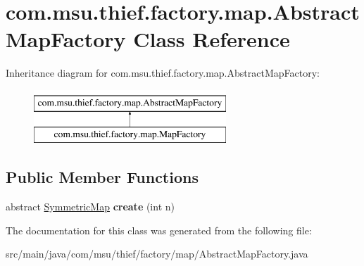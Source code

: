 \hypertarget{classcom_1_1msu_1_1thief_1_1factory_1_1map_1_1AbstractMapFactory}{\section{com.\-msu.\-thief.\-factory.\-map.\-Abstract\-Map\-Factory Class Reference}
\label{classcom_1_1msu_1_1thief_1_1factory_1_1map_1_1AbstractMapFactory}
}
Inheritance diagram for com.\-msu.\-thief.\-factory.\-map.\-Abstract\-Map\-Factory\-:\begin{figure}[H]
\begin{center}
\leavevmode
\includegraphics[height=2.000000cm]{classcom_1_1msu_1_1thief_1_1factory_1_1map_1_1AbstractMapFactory}
\end{center}
\end{figure}
\subsection*{Public Member Functions}
\begin{DoxyCompactItemize}
\item 
\hypertarget{classcom_1_1msu_1_1thief_1_1factory_1_1map_1_1AbstractMapFactory_a8d7acb0ef65995620cb558c1e3de2b3e}{abstract \hyperlink{classcom_1_1msu_1_1thief_1_1model_1_1SymmetricMap}{Symmetric\-Map} {\bfseries create} (int n)}\label{classcom_1_1msu_1_1thief_1_1factory_1_1map_1_1AbstractMapFactory_a8d7acb0ef65995620cb558c1e3de2b3e}

\end{DoxyCompactItemize}


The documentation for this class was generated from the following file\-:\begin{DoxyCompactItemize}
\item 
src/main/java/com/msu/thief/factory/map/Abstract\-Map\-Factory.\-java\end{DoxyCompactItemize}
